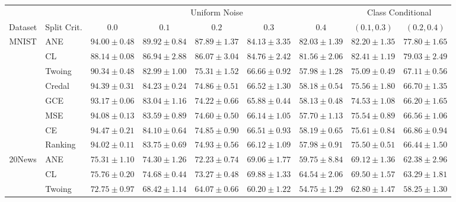 \documentclass[letterpaper]{article} %
\begin{document}
\begin{table}[t]
	\scriptsize
	\centering
	\begin{tabular}{clccccccc}
&& \multicolumn{5}{c}{Uniform Noise} & \multicolumn{2}{c}{Class Conditional} \\ \cline{3-9}
Dataset & Split Crit. & $0.0$ & $0.1$ & $0.2$ & $0.3$ & $0.4$ & $(0.1,0.3)$ & $(0.2,0.4)$  \\ \hline
\multirow{8}{*}{MNIST}
 & ANE    & $\mathbf{94.00 \pm 0.48}$ & $\mathbf{89.92 \pm 0.84}$ & $\mathbf{87.89 \pm 1.37}$ & $\mathbf{84.13 \pm 3.35}$ & $\mathbf{82.03 \pm 1.39}$ & $\mathbf{82.20 \pm 1.35}$ & $\mathbf{77.80 \pm 1.65}$ \\
 & CL     & $88.14 \pm 0.08$ & $86.94 \pm 2.88$ & $\mathbf{86.07 \pm 3.04}$ & $\mathbf{84.76 \pm 2.42}$ & $\mathbf{81.56 \pm 2.06}$ & $\mathbf{82.41 \pm 1.19}$ & $\mathbf{79.03 \pm 2.49}$ \\
 & Twoing & $90.34 \pm 0.48$ & $82.99 \pm 1.00$ & $75.31 \pm 1.52$ & $66.66 \pm 0.92$ & $57.98 \pm 1.28$ & $75.09 \pm 0.49$ & $67.11 \pm 0.56$ \\
 & Credal & $\mathbf{94.39 \pm 0.31}$ & $84.23 \pm 0.24$ & $74.86 \pm 0.51$ & $66.52 \pm 1.30$ & $58.18 \pm 0.54$ & $75.56 \pm 1.80$ & $66.70 \pm 1.35$ \\
 & GCE    & $93.17 \pm 0.06$ & $83.04 \pm 1.16$ & $74.22 \pm 0.66$ & $65.88 \pm 0.44$ & $58.13 \pm 0.48$ & $74.53 \pm 1.08$ & $66.20 \pm 1.65$ \\
 & MSE    & $94.08 \pm 0.13$ & $83.59 \pm 0.89$ & $74.60 \pm 0.50$ & $66.14 \pm 1.05$ & $57.70 \pm 1.13$ & $75.54 \pm 0.89$ & $66.56 \pm 1.06$ \\
 & CE     & $\mathbf{94.47 \pm 0.21}$ & $84.10 \pm 0.64$ & $74.85 \pm 0.90$ & $66.51 \pm 0.93$ & $58.19 \pm 0.65$ & $75.61 \pm 0.84$ & $66.86 \pm 0.94$ \\
 & Ranking & $94.02 \pm 0.11$ & $83.75 \pm 0.69$ & $74.93 \pm 0.56$ & $66.12 \pm 1.09$ & $57.98 \pm 0.91$ & $75.50 \pm 0.51$ & $66.44 \pm 1.50$ \\
\hline
\multirow{8}{*}{20News}
 & ANE    & $\mathbf{75.31 \pm 1.10}$ & $\mathbf{74.30 \pm 1.26}$ & $72.23 \pm 0.74$ & $\mathbf{69.06 \pm 1.77}$ & $\mathbf{59.75 \pm 8.84}$ & $\mathbf{69.12 \pm 1.36}$ & $\mathbf{62.38 \pm 2.96}$ \\
 & CL     & $\mathbf{75.76 \pm 0.20}$ & $\mathbf{74.68 \pm 0.44}$ & $\mathbf{73.27 \pm 0.48}$ & $\mathbf{69.88 \pm 1.33}$ & $\mathbf{64.54 \pm 2.06}$ & $\mathbf{69.50 \pm 1.57}$ & $\mathbf{63.29 \pm 1.81}$ \\
 & Twoing & $72.75 \pm 0.97$ & $68.42 \pm 1.14$ & $64.07 \pm 0.66$ & $60.20 \pm 1.22$ & $54.75 \pm 1.29$ & $62.80 \pm 1.47$ & $58.25 \pm 1.30$ \\

\end{tabular}
\end{table}
\end{document}
